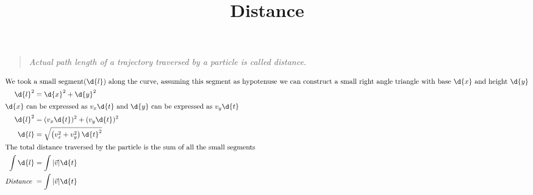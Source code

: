 \documentclass{article}
\title{Distance}
\begin{document}
\maketitle

\begin{center}
    \begin{quote}
        \textit{Actual path length of a trajectory traversed by a particle is called distance.}
    \end{quote}
\end{center}

\begin{center}
\end{center}
    \begin{align*}
        \intertext{We took a small segment($\d{l}$) along the curve, assuming this segment as hypotenuse we can construct a small right angle triangle with base $\d{x}$ and height $\d{y}$}
        \d{l}^2 &= \d{x}^2 + \d{y}^2\\
        \intertext{$\d{x}$ can be expressed as $v_x \d{t}$ and $\d{y}$ can be expressed as $v_y \d{t}$}
        \d{l}^2 &= (v_x \d{t})^2 + (v_y \d{t})^2\\
        \d{l} &= \sqrt{\left(v_x^2 + v_y^2 \right)\d{t}^2}\\
        \intertext{The total distance traversed by the particle is the sum of all the small segments}
        \int \d{l} &= \int |\vec{v}|\d{t}\\  
        \textit{Distance } &= \int |\vec{v}|\d{t}\\
    \end{align*}
\end{document}
